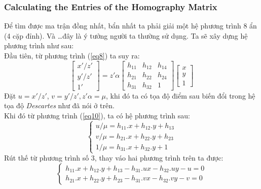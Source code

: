\documentclass{article}
\begin{document}
\subsubsection{Calculating the Entries of the Homography Matrix}
Để tìm được ma trận đồng nhất, bẩn nhất ta phải giải một hệ phương trình 8 ẩn (4 cặp đỉnh). Và \ldots đây là ý tưởng người ta thường sử dụng. Ta sẽ xây dựng hệ phương trình như sau:\\
Đầu tiên, từ phương trình (\ref{eq8}) ta suy ra:
\begin{equation}
\begin{bmatrix}
    x'/z'\\y'/z'\\1'
\end{bmatrix} = z'\alpha \begin{bmatrix}
    h_{11}&h_{12}&h_{14}\\
    h_{21}&h_{22}&h_{24}\\
    h_{31}&h_{32}&1
\end{bmatrix}\begin{bmatrix}
    x\\y\\1
\end{bmatrix}
\label{eq10}
\end{equation}
Đặt $u = x'/z'$, $v = y'/z', z'\alpha = \mu$, khi đó ta có tọa độ điểm sau biến đổi trong hệ tọa độ \textit{Descartes} như đã nói ở trên.\\
Khi đó từ phương trình (\ref{eq10}), ta có hệ phương trình sau:
\begin{equation}
\begin{cases}
u/\mu = h_{11}.x+h_{12}.y+h_{13}\\
v/\mu = h_{21}.x+h_{22}.y+h_{23}\\
1/\mu = h_{31}.x+h_{32}.y+1

\end{cases}
\label{eq11}
\end{equation}
Rút thế từ phương trình số 3, thay váo hai phương trình trên ta được:
\begin{equation}
\begin{cases}
h_{11}.x+h_{12}.y+h_{13}-h_{31}.ux-h_{32}.uy-u=0\\
h_{21}.x+h_{22}.y+h_{23}-h_{31}.vx-h_{32}.vy-v = 0
\end{cases}
\label{eq12}
\end{equation}
\end{document}
